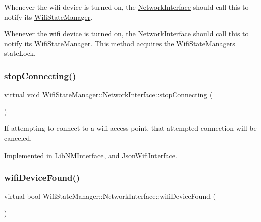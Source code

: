 Whenever the wifi device is turned on, the \mbox{\hyperlink{classWifiStateManager_1_1NetworkInterface}{Network\+Interface}} should call this to notify its \mbox{\hyperlink{classWifiStateManager}{Wifi\+State\+Manager}}.

Whenever the wifi device is turned on, the \mbox{\hyperlink{classWifiStateManager_1_1NetworkInterface}{Network\+Interface}} should call this to notify its \mbox{\hyperlink{classWifiStateManager}{Wifi\+State\+Manager}}. This method acquires the \mbox{\hyperlink{classWifiStateManager}{Wifi\+State\+Manager}}\textquotesingle{}s state\+Lock. \mbox{\label{classWifiStateManager_1_1NetworkInterface_a201033fbed61d18311773c3035806fc0}} 
\subsubsection{\texorpdfstring{stop\+Connecting()}{stopConnecting()}}
{\footnotesize\ttfamily virtual void Wifi\+State\+Manager\+::\+Network\+Interface\+::stop\+Connecting (\begin{DoxyParamCaption}{ }\end{DoxyParamCaption})\hspace{0.3cm}{\ttfamily [pure virtual]}}

If attempting to connect to a wifi access point, that attempted connection will be canceled. 

Implemented in \mbox{\hyperlink{classLibNMInterface_a46a4b026d110f3f397bd74aa413a6276}{Lib\+N\+M\+Interface}}, and \mbox{\hyperlink{classJsonWifiInterface_abb186f1293c4f5b7c28dfb2b86f8c95a}{Json\+Wifi\+Interface}}.

\mbox{\label{classWifiStateManager_1_1NetworkInterface_a0c2675d835715d956315d9e04e2667f9}} 
\subsubsection{\texorpdfstring{wifi\+Device\+Found()}{wifiDeviceFound()}}
{\footnotesize\ttfamily virtual bool Wifi\+State\+Manager\+::\+Network\+Interface\+::wifi\+Device\+Found (\begin{DoxyParamCaption}{ }\end{DoxyParamCaption})\hspace{0.3cm}{\ttfamily [pure virtual]}}

